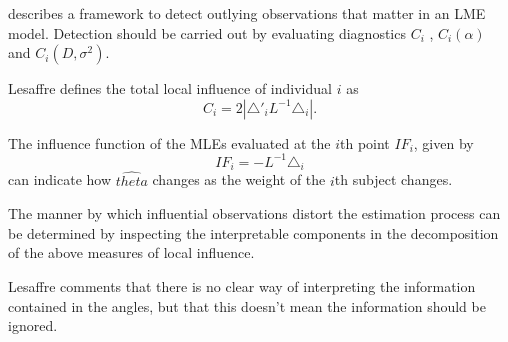 \documentclass[Main.tex]{subfiles}
\begin{document}
\citet{lesaffre} describes a framework to detect outlying observations that matter in an LME model. Detection should be carried out by evaluating diagnostics $C_{i}$ , $C_{i}(\alpha)$ and $C_{i}(D,\sigma^2)$.


Lesaffre defines the total local influence of individual $i$ as
\begin{equation}
C_{i} = 2 | \triangle \prime _{i} L^{-1} \triangle_{i}|.
\end{equation}


The influence function of the MLEs evaluated at the $i$th point $IF_{i}$, given by
\begin{equation}
IF_{i} = -L^{-1}\triangle _{i}
\end{equation}
can indicate how $\hat{theta}$ changes as the weight of the $i$th
subject changes.

The manner by which influential observations distort the estimation process can be determined by inspecting the
interpretable components in the decomposition of the above measures of local influence.


Lesaffre comments that there is no clear way of interpreting the information contained in the angles, but that this doesn't mean the information should be ignored.


\end{document}
